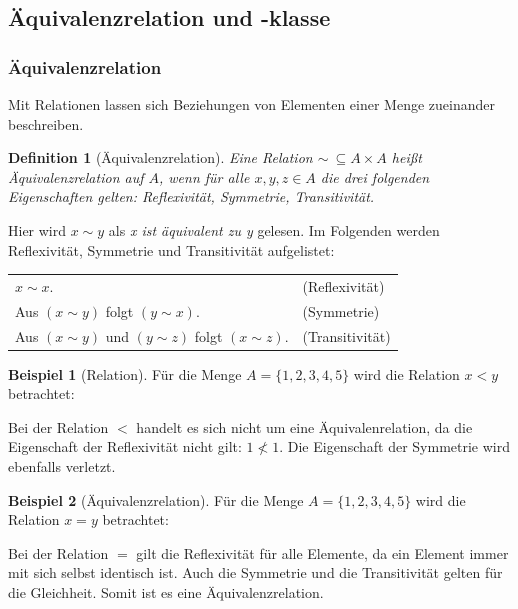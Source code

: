 \documentclass[12pt,a4paper, usenames, dvipsnames]{article}
\theoremstyle{mystyle}
\newtheorem{definition}{Definition}
\theoremstyle{definition}
\newtheorem{bsp}{Beispiel}[definition]
\begin{document}
\subsection{Äquivalenzrelation und -klasse}

 
\subsubsection*{Äquivalenzrelation}

 \label{Abschnitt_Äquivalenrelationen}

Mit Relationen lassen sich Beziehungen von Elementen einer Menge zueinander beschreiben.

\begin{definition}[Äquivalenzrelation]
Eine Relation $\sim \ \subseteq A \times A$ heißt Äquivalenzrelation auf $A$, wenn für alle $x, y, z \in A$ die drei folgenden Eigenschaften gelten: Reflexivität, Symmetrie, Transitivität.
\end{definition}


Hier wird $x \sim y$ als \textit{x ist äquivalent zu y} gelesen. Im Folgenden werden Reflexivität, Symmetrie und Transitivität aufgelistet:

\begin{center}
\begin{tabular}{ll}
$x \sim x$. & (Reflexivität) \\
Aus $(x \sim y)$ folgt $(y \sim x)$. & (Symmetrie) \\
Aus $(x \sim y)$ und $(y \sim z)$ folgt $(x \sim z)$. & (Transitivität) \\
\end{tabular}
\end{center}


\begin{bsp}[Relation]


Für die Menge $A=\{ 1, 2, 3, 4, 5 \}$ wird die Relation $ x < y$ betrachtet:

Bei der Relation $< $ handelt es sich nicht um eine Äquivalenrelation, da die Eigenschaft der Reflexivität nicht gilt: $1 \nless 1$. Die Eigenschaft der Symmetrie wird ebenfalls verletzt.


\end{bsp}
\begin{bsp}[Äquivalenzrelation]
Für die Menge $A=\{ 1, 2, 3, 4, 5 \}$ wird die Relation $ x = y$ betrachtet:

Bei der Relation $=$ gilt die Reflexivität für alle Elemente, da ein Element immer mit sich selbst identisch ist. Auch die Symmetrie und die Transitivität gelten für die Gleichheit. Somit ist es eine Äquivalenzrelation. 


\end{bsp}
\end{document}
